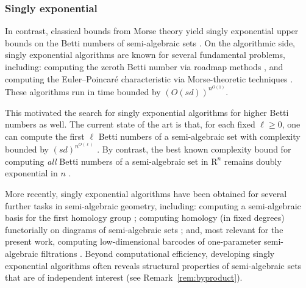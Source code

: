 \documentclass{amsart}[10pts]
\theoremstyle{definition}
\theoremstyle{remark}
\theoremstyle{observation}
\numberwithin{equation}{section}
\newcommand {\R} {\mathrm{R}}
\begin{document}
\subsubsection{Singly exponential}
In contrast, classical bounds from Morse theory yield singly exponential upper bounds on the Betti numbers of semi-algebraic sets \cite{OP,T,Milnor2,B99,GV07}.
On the algorithmic side, singly exponential algorithms are known for several fundamental problems, including:
computing the zeroth Betti number via roadmap methods \cite{Canny93a,GV92,BPR99,BRSS14,BR14}, and computing the Euler--Poincar\'e characteristic via Morse-theoretic techniques \cite{B99,BPR-euler-poincare}.
These algorithms run in time bounded by $(O(sd))^{n^{O(1)}}$.

This motivated the search for singly exponential algorithms for higher Betti numbers as well. 
The current state of the art is that, for each fixed $\ell\ge 0$, one can compute the first $\ell$ Betti numbers of a semi-algebraic set with complexity bounded by $(sd)^{n^{O(\ell)}}$ \cite{Bas05-first,BPRbettione,Basu-Karisani-1}.
By contrast, the best known complexity bound for computing \emph{all} Betti numbers of a semi-algebraic set in $\R^n$ remains doubly exponential in $n$ \cite{SS,Basu_survey}.

More recently, singly exponential algorithms have been obtained for several further tasks in semi-algebraic geometry, including: computing a semi-algebraic basis for the first homology group \cite{Basu-Percival}; computing homology (in fixed degrees) functorially on diagrams of semi-algebraic sets \cite{Basu-Karisani-3}; and, most relevant for the present work, computing low-dimensional barcodes of one-parameter semi-algebraic filtrations \cite{Basu-Karisani-2}. 
Beyond computational efficiency, developing singly exponential algorithms often reveals structural properties of semi-algebraic sets that are of independent interest (see Remark~\ref{rem:byproduct}).
\end{document}
